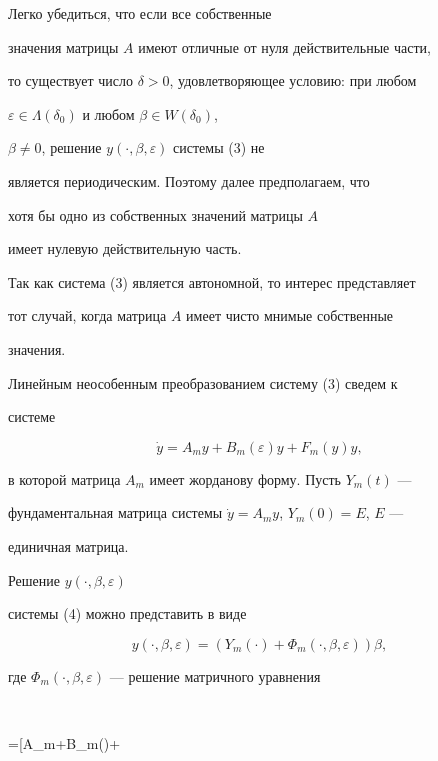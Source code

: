  


Легко убедиться, что если все собственные 


значения матрицы $A$ имеют отличные от нуля действительные части, 


то существует число $\delta>0$, удовлетворяющее условию: при любом 


$\varepsilon\in\Lambda(\delta_0)$ и любом $\beta\in W(\delta_0)$, 


$\beta\ne 0$, решение $y(\cdot,\beta,\varepsilon)$ системы (3) не 


является периодическим. Поэтому далее предполагаем, что 


хотя бы одно из собственных значений матрицы $A$ 


имеет нулевую действительную часть. 


 


Так как система (3) является автономной, то интерес представляет 


тот случай, когда матрица $A$ имеет чисто мнимые собственные 


значения. 


 


Линейным неособенным преобразованием систему (3) сведем к 


системе 


\begin{equation} 


\Dot y=A_m y+B_m(\varepsilon)y+F_m(y)y, 


\end{equation} 


в которой матрица $A_m$ имеет жорданову форму. Пусть $Y_m(t)$ --- 


фундаментальная матрица системы $\Dot y=A_m y$, $Y_m(0)=E$, $E$ --- 


единичная матрица. 


Решение $y(\cdot,\beta,\varepsilon)$ 


системы (4) можно представить в виде 


$$ 


y(\cdot,\beta,\varepsilon)=(Y_m(\cdot)+\Phi_m(\cdot,\beta,\varepsilon)) 


\beta, 


$$ 


где $\Phi_m(\cdot,\beta,\varepsilon)$ --- решение матричного уравнения 


$$ 


\Dot \Phi=[A_m+B_m(\varepsilon)+ 


